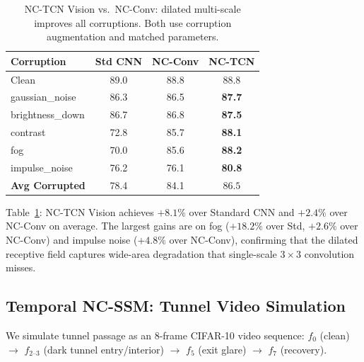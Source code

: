 \documentclass[runningheads]{llncs}
\begin{document}
\begin{table}[t]
\centering
\caption{NC-TCN Vision vs.\ NC-Conv: dilated multi-scale improves all corruptions. Both use corruption augmentation and matched parameters.}
\label{tab:nctcn}
\small
\begin{tabular}{@{}lccc@{}}
\toprule
\textbf{Corruption} & \textbf{Std CNN} & \textbf{NC-Conv} & \textbf{NC-TCN} \\
\midrule
Clean              & 89.0 & 88.8 & 88.8 \\
\midrule
gaussian\_noise    & 86.3 & 86.5 & \textbf{87.7} \\
brightness\_down   & 86.7 & 86.8 & \textbf{87.5} \\
contrast           & 72.8 & 85.7 & \textbf{88.1} \\
fog                & 70.0 & 85.6 & \textbf{88.2} \\
impulse\_noise     & 76.2 & 76.1 & \textbf{80.8} \\
\midrule
\textbf{Avg Corrupted} & 78.4 & 84.1 & $\mathbf{86.5}$ \\
\bottomrule
\end{tabular}
\end{table}

Table~\ref{tab:nctcn}: NC-TCN Vision achieves $\mathbf{+8.1\%}$ over Standard CNN and $+2.4\%$ over NC-Conv on average.
The largest gains are on fog ($+18.2\%$ over Std, $+2.6\%$ over NC-Conv) and impulse noise ($+4.8\%$ over NC-Conv), confirming that the dilated receptive field captures wide-area degradation that single-scale $3{\times}3$ convolution misses.

\subsection{Temporal NC-SSM: Tunnel Video Simulation}
\label{sec:temporal_exp}

We simulate tunnel passage as an 8-frame CIFAR-10 video sequence: $f_0$ (clean) $\to$ $f_{2\text{--}3}$ (dark tunnel entry/interior) $\to$ $f_5$ (exit glare) $\to$ $f_7$ (recovery).
\end{document}
